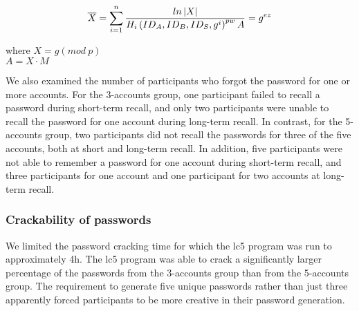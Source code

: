 \documentclass[fleqn]{Paquetes/RevDigMatEduInt}
\begin{document}
\begin{equation}
    \centering
	\overline{X} = \sum_{i = 1}^{n} \frac{ln\left|X\right|}{H_{i}\left(ID_{A}, ID_{B}, ID_{S}, g^{i} \right)^{pw} A} = g^{ez}
	\label{eqn:04}
\end{equation}

where $X = g(mod\ p)$ \\
$A = X \cdot M $

We also examined the number of participants who forgot the password for one or more accounts. For the 3-accounts group, one participant failed to recall a password during short-term recall, and only two participants were unable to recall the password for one account during long-term recall. In contrast, for the 5-accounts group, two participants did not recall the passwords for three of the five accounts, both at short and long-term recall. In addition, five participants were not able to remember a password for one account during short-term recall, and three participants for one account and one participant for two accounts at long-term recall.

\subsubsection{Crackability of passwords}

We limited the password cracking time for which the lc5 program was run to approximately 4h. The lc5 program was able to crack a significantly larger percentage of the passwords from the 3-accounts group than from the 5-accounts group. The requirement to generate five unique passwords rather than just three apparently forced participants to be more creative in their password generation.
\end{document}
